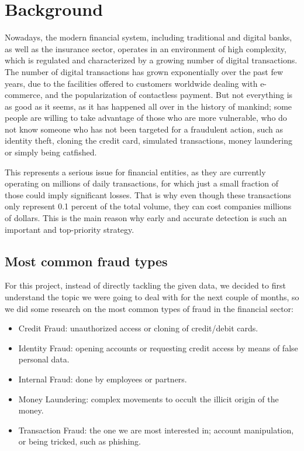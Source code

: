 \documentclass[12pt,a4paper]{report}
\begin{document}
\section{Background}
Nowadays, the modern financial system, including traditional and digital banks, as well as the insurance sector, operates in an environment of high complexity, which is regulated and characterized by a growing number of digital transactions.
The number of digital transactions has grown exponentially over the past few years, due to the facilities offered to customers worldwide dealing with e-commerce, and the popularization of contactless payment. But not everything is as good as it seems, as it has happened all over in the history of mankind; some people are willing to take advantage of those who are more vulnerable, who do not know someone who has not been targeted for a fraudulent action, such as identity theft, cloning the credit card, simulated transactions, money laundering or simply being catfished.

This represents a serious issue for financial entities, as they are currently operating on millions of daily transactions, for which just a small fraction of those could imply significant losses. That is why even though these transactions only represent 0.1 percent of the total volume, they can cost companies millions of dollars. This is the main reason why early and accurate detection is such an important and top-priority strategy.
\subsection{Most common fraud types}
For this project, instead of directly tackling the given data, we decided to first understand the topic we were going to deal with for the next couple of months, so we did some research on the most common types of fraud in the financial sector:
\begin{itemize}
    \item Credit Fraud: unauthorized access or cloning of credit/debit cards. 
    \item Identity Fraud: opening accounts or requesting credit access by means of false personal data.
    \item Internal Fraud: done by employees or partners.
    \item Money Laundering: complex movements to occult the illicit origin of the money. 
    \item Transaction Fraud: the one we are most interested in; account manipulation, or being tricked, such as phishing.
\end{itemize}
\end{document}
